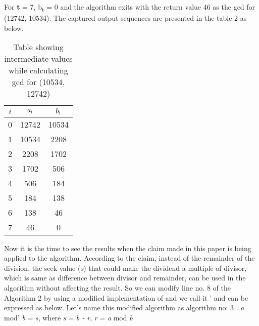 \documentclass[conference,compsoc]{IEEEtran}
\newcommand{\var}[1]{\textit{#1}}
\renewcommand{\mod}{\text{mod}}
\begin{document}
For \textbf{t} = 7, b\textsubscript{t} = 0 and the algorithm exits with the return value 
46 as the gcd for (12742, 10534). The captured output sequences are presented in the table 2 as below.
\begin{table}[!htbp]
\caption{Table showing intermediate values while calculating gcd for (10534, 12742)}
\label{table_org_book_example}
\centering
	\begin{tabular}{c | c | c}
		\hline
		$i$ & $a\textsubscript{i}$ & $b\textsubscript{i}$ \\ [0.5ex] 
		\hline
		0 & 12742 & 10534 \\ 
		1 & 10534 & 2208 \\  
		2 & 2208  & 1702 \\
		3 & 1702  & 506 \\
		4 & 506   & 184 \\
		5 & 184   & 138 \\
		6 & 138   & 46 \\
		7 & 46    & 0
	\end{tabular}
\end{table}

Now it is the time to see the results when the claim made in this paper is being applied 
to the algorithm. According to the claim, instead of the remainder of the division, the seek value (\var{s}) that could make the dividend a multiple of divisor, which is same as difference between divisor and remainder, can be used in the algorithm without affecting the result. So we can modify line no. 8 of the Algorithm 2 by using a modified implementation of \mod and we call it \mod' and can be expressed as below. Let's name this modified algorithm as algorithm no: 3 .  \linebreak
\textit{a} mod' \textit{b} = \textit{s}, where  \textit{s} = \textit{b - r}, \textit{r} = \textit{a} mod \textit{b}
\end{document}
